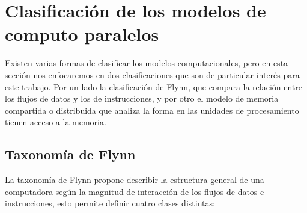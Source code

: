 
\section{Clasificación de los modelos de computo paralelos}

\label{mt_modelosparalelos}

Existen varias formas de clasificar los modelos computacionales, pero en esta
sección nos enfocaremos en dos clasificaciones que son de particular interés
para este trabajo. Por un lado la clasificación de Flynn, que compara la
relación entre los flujos de datos y los de instrucciones, y por otro el modelo
de memoria compartida o distribuida que analiza la forma en las unidades de
procesamiento tienen acceso a la memoria.

\subsection{Taxonomía de Flynn}

La taxonomía de Flynn\cite{flynnstaxonomy1972} propone describir la estructura
general de una computadora según la magnitud de interacción de los flujos de
datos e instrucciones, esto permite definir cuatro clases distintas:

